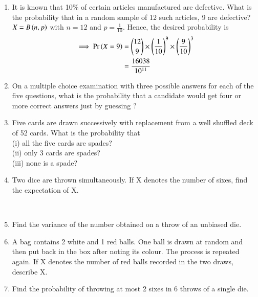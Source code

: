 \begin{enumerate}[label=\thesection.\arabic*.,ref=\thesection.\theenumi]
\item It is known that 10$\%$ of certain articles manufactured are defective. What is the probability that in a random sample of 12 such articles, 9 are defective?\\
\solution $X = B \left(n,p\right)$ with $n=12$ and $p=\frac{1}{10}$.  Hence, the desired probability is
%
\begin{align}
  \implies\Pr\left(X=9\right) &={12 \choose 9}\times\left(\frac{1}{10}\right)^9\times\left(\frac{9}{10}\right)^{3} \\  &=\frac{16038}{10^{11}}
\end{align}
\item On a multiple choice examination with three possible answers for each of the five questions, what is the probability that a candidate would get four or more correct answers just by guessing ?
\\
\solution


\item Five cards are drawn successively with replacement from a well shuffled deck of 52 cards. What is the probability that\\
(i) all the five cards are spades?\\
(ii) only 3 cards are spades?\\
(iii) none is a spade?\\
\solution 


\item Two dice are thrown simultaneously. If X denotes the number of sixes, find the
expectation of X.\\
\solution

\\
\item Find the variance of the number obtained on a throw of an unbiased die.\\

\item A bag contains 2 white and 1 red balls. One ball is drawn at random and then put back in the box after noting its colour. The process is repeated again. If X denotes the number of red balls recorded in the two draws, describe X.\\

\item Find the probability of throwing at most 2 sixes in 6 throws of a single die.\\
\solution

\end{enumerate}


